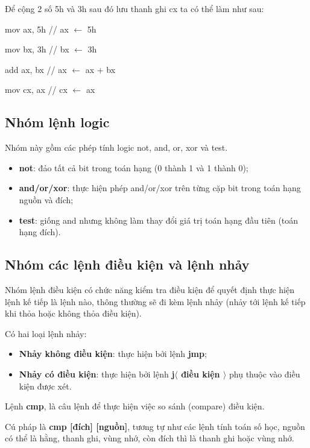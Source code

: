 \begin{example}
    Để cộng 2 số 5h và 3h sau đó lưu thanh ghi cx ta có thể làm như sau:

    mov ax, 5h // ax $\leftarrow$ 5h

    mov bx, 3h // bx $\leftarrow$ 3h

    add ax, bx // ax $\leftarrow$ ax + bx

    mov cx, ax // cx $\leftarrow$ ax
\end{example}

\subsection*{Nhóm lệnh logic}

Nhóm này gồm các phép tính logic not, and, or, xor và test.

\begin{itemize}
    \item \textbf{not}: đảo tất cả bit trong toán hạng (0 thành 1 và 1 thành 0);
    \item \textbf{and/or/xor}: thực hiện phép and/or/xor trên từng cặp bit trong toán hạng nguồn và đích;
    \item \textbf{test}: giống and nhưng không làm thay đổi giá trị toán hạng đầu tiên (toán hạng đích).
\end{itemize}

\subsection*{Nhóm các lệnh điều kiện và lệnh nhảy}

Nhóm lệnh điều kiện có chức năng kiểm tra điều kiện để quyết định thực hiện lệnh kế tiếp là lệnh nào, thông thường sẽ đi kèm lệnh nhảy (nhảy tới lệnh kế tiếp khi thỏa hoặc không thỏa điều kiện).

Có hai loại lệnh nhảy:

\begin{itemize}
    \item \textbf{Nhảy không điều kiện}: thực hiện bởi lệnh \textbf{jmp};
    \item \textbf{Nhảy có điều kiện}: thực hiện bởi lệnh \textbf{j$\langle$ điều kiện $\rangle$} phụ thuộc vào điều kiện được xét.
\end{itemize}

Lệnh \textbf{cmp}, là câu lệnh để thực hiện việc so sánh (compare) điều kiện.

Cú pháp là \textbf{cmp [đích] [nguồn]}, tương tự như các lệnh tính toán số học, nguồn có thể là hằng, thanh ghi, vùng nhớ, còn đích thì là thanh ghi hoặc vùng nhớ.

